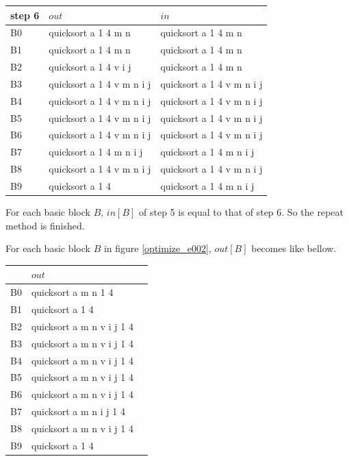 \begin{tabular}{|l|l|l|} \hline
step 6  & $out$             & $in$      \\ \hline
B0 & quicksort a 1 4 m n       & quicksort a 1 4 m n        \\ \hline
B1 & quicksort a 1 4 m n       & quicksort a 1 4 m n        \\ \hline
B2 & quicksort a 1 4 v i j     & quicksort a 1 4 m n        \\ \hline
B3 & quicksort a 1 4 v m n i j & quicksort a 1 4 v m n i j  \\ \hline
B4 & quicksort a 1 4 v m n i j & quicksort a 1 4 v m n i j  \\ \hline
B5 & quicksort a 1 4 v m n i j & quicksort a 1 4 v m n i j  \\ \hline
B6 & quicksort a 1 4 v m n i j & quicksort a 1 4 v m n i j  \\ \hline
B7 & quicksort a 1 4 m n i j   & quicksort a 1 4 m n i j  \\ \hline
B8 & quicksort a 1 4 v m n i j & quicksort a 1 4 v m n i j  \\ \hline
B9 & quicksort a 1 4           & quicksort a 1 4 m n i j \\ \hline
\end{tabular}

\vspace{0.5cm}
For each basic block $B$, $in[B]$ of step 5 is equal to that of step 6.
So the repeat method is finished.

For each basic block $B$ in figure \ref{optimize_e002},
$out[B]$ becomes like bellow.

\vspace{0.5cm}

\begin{tabular}{|l|l|l|} \hline
   & $out$                            \\ \hline
B0 & quicksort a m n  1 4             \\  \hline
B1 & quicksort a 1 4                  \\ \hline
B2 & quicksort a m n  v i j 1 4       \\ \hline
B3 & quicksort a m n  v i j 1 4       \\ \hline
B4 & quicksort a m n  v i j 1 4       \\ \hline
B5 & quicksort a m n  v i j 1 4       \\ \hline
B6 & quicksort a m n  v i j 1 4       \\ \hline
B7 & quicksort a m n    i j 1 4       \\ \hline
B8 & quicksort a m n  v i j 1 4       \\ \hline
B9 & quicksort a 1 4              \\ \hline
\end{tabular}

